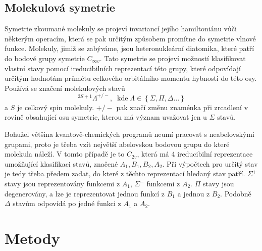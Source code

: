 \subsection{Molekulová symetrie}
Symetrie zkoumané molekuly se projeví invariancí jejího hamiltoniánu vůči některým operacím, která se pak určitým 
způsobem promítne do symetrie vlnové funkce.
Molekuly, jimiž se zabýváme, jsou heteronukleární diatomika, které patří do bodové grupy 
symetrie $C_{\infty v}$. Tato symetrie se projeví možností klasifikovat vlastní stavy 
pomocí ireducibilních reprezentací této grupy, které odpovídají určitým hodnotám 
průmětu celkového orbitálního momentu hybnosti do této osy. Používá se značení molekulových stavů
\begin{equation}
^{2S+1}\Lambda^{+/-},\;\;\mathrm{kde }\;\Lambda\in\left\lbrace \Sigma, \Pi,\Delta \dots 
\right\rbrace
\end{equation}
a $S$ je celkový spin molekuly. $+/-$ pak značí změnu znaménka při zrcadlení v rovině 
obsahující osu symetrie, kterou má význam uvažovat jen u $\Sigma$ stavů.

Bohužel většina kvantově-chemických programů neumí pracovat s neabelovskými grupami, 
proto je třeba vzít největší abelovskou bodovou grupu do které molekula náleží. V 
tomto 
případě je to $C_{2v}$, která má 4 ireducibilní reprezentace umožňující klasifikaci 
stavů, značené $A_1, B_1, B_2, A_2$. Při výpočtech pro určitý stav je tedy třeba 
předem zadat, do které z těchto reprezentací hledaný stav patří.
$\Sigma^+$ stavy jsou reprezentovány funkcemi z $A_1$, $\Sigma^-$ funkcemi z $A_2$.
$\Pi$ stavy jsou degenerovány, a lze je reprezentovat jednou funkcí z $B_1$ a jednou z $B_2$. Podobně $\Delta$ stavům odpovídá po jedné funkci z $A_1$ a $A_2$.
\section{Metody}
